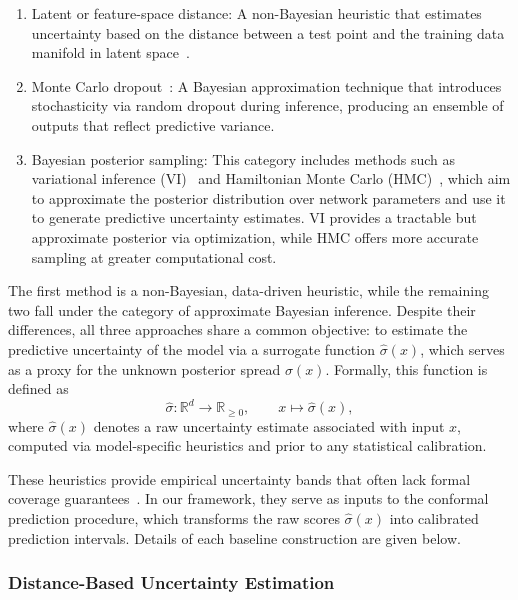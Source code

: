 \documentclass[preprint,12pt]{elsarticle}
\begin{document}
\begin{enumerate}[label=(\roman*)]
\item Latent or feature-space distance: A non-Bayesian heuristic that estimates uncertainty based on the distance between a test point and the training data manifold in latent space~\cite{hu_robust_2022}.

\item Monte Carlo dropout~\cite{gal_dropout_2016}: A Bayesian approximation technique that introduces stochasticity via random dropout during inference, producing an ensemble of outputs that reflect predictive variance.

\item Bayesian posterior sampling: This category includes methods such as variational inference (VI)~\cite{blei2017variational} and Hamiltonian Monte Carlo (HMC)~\cite{yang_b-pinns_2021}, which aim to approximate the posterior distribution over network parameters and use it to generate predictive uncertainty estimates. VI provides a tractable but approximate posterior via optimization, while HMC offers more accurate sampling at greater computational cost.
\end{enumerate}

The first method is a non-Bayesian, data-driven heuristic, while the remaining two fall under the category of approximate Bayesian inference. Despite their differences, all three approaches share a common objective: to estimate the predictive uncertainty of the model via a surrogate function $\hat{\sigma}(x)$, which serves as a proxy for the unknown posterior spread $\sigma(x)$. Formally, this function is defined as
\begin{equation}
\hat{\sigma}:\mathbb{R}^{d} \longrightarrow \mathbb{R}_{\ge 0}, \qquad
  x \mapsto \hat{\sigma}(x),
\label{eq:raw_hu_func}
\end{equation}
where $\hat{\sigma}(x)$ denotes a raw uncertainty estimate associated with input $x$, computed via model-specific heuristics and prior to any statistical calibration.

These heuristics provide empirical uncertainty bands that often lack formal coverage guarantees~\cite{mousavi2017heuristics}. In our framework, they serve as inputs to the conformal prediction procedure, which transforms the raw scores $\hat{\sigma}(x)$ into calibrated prediction intervals. Details of each baseline construction are given below.

\subsubsection{Distance-Based Uncertainty Estimation}
\label{sec:sub:distance}
\end{document}
